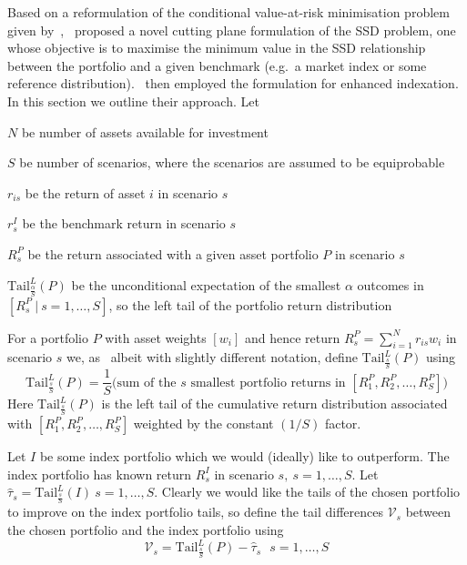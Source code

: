 Based on a  reformulation of the conditional value-at-risk
minimisation problem given by~\cite{kunzi2006},~\cite{fabian2011} proposed a novel cutting plane formulation
 of the SSD problem, one whose objective is to maximise the minimum value in the SSD relationship between the 
portfolio and a given benchmark (e.g.~a market index or some reference distribution).~\cite{roman2013} then employed the formulation for
 enhanced indexation. In this section we outline their approach. Let 
\begin{compactitem}
\item $N$  be number of assets available for  investment
\item $S$ be  number of scenarios, where the scenarios are assumed to be equiprobable
\item $r_{is}$ be the return of asset $i$ in scenario $s$
\item $r^I_{s}$ be the benchmark return in scenario $s$
\item $R_s^P$ be the return associated with a given asset portfolio $P$ in scenario $s$
\item $\text{Tail}^L_{\frac{\alpha}{S}}(P)$ be the unconditional expectation of the smallest $\alpha$ outcomes in $[R_s^P~|~s=1,\ldots,S]$, so the left tail of the portfolio return distribution 
\end{compactitem}

\noindent For a portfolio $P$ with asset weights $[w_i]$ and hence return $R_s^P= \sum_{i=1}^N r_{is}w_i$ in scenario $s$ we, as~\cite{fabian2011} 
albeit with slightly different notation, define $\text{Tail}^L_{\frac{s}{S}}(P)$ using 
\begin{equation}
 \text{Tail}^L_{\frac{s}{S}}(P) = \frac{1}{S} \text{(sum of the $s$ smallest portfolio returns in $[R_1^P, R_2^P,\ldots,R_S^P]$)}
\label{jebt1}
\end{equation}
\sloppy Here $\text{Tail}^L_{\frac{s}{S}}(P) $ is the left tail of the cumulative return distribution associated with $[R_1^P, R_2^P,\ldots,R_S^P]$
weighted by the constant $(1/S)$ factor.


 Let $I$ be some index portfolio which we would (ideally) like to outperform. The index portfolio has known return $R_s^I$ in scenario $s,~s=1,\ldots,S$.
Let $\hat{\tau}_s =  \text{Tail}^L_{\frac{s}{S}}(I)~s=1,\ldots,S$.  Clearly we would like the tails of the chosen portfolio to improve on the index portfolio tails, so define 
the tail differences  $\mathcal{V}_s$ between the chosen portfolio and the index portfolio using 
\begin{equation}
  \mathcal{V}_s   = \text{Tail}^L_{\frac{s}{S}}(P) - \hat{\tau}_s~~~s=1,\ldots,S
\label{jebt2}
\end{equation}

